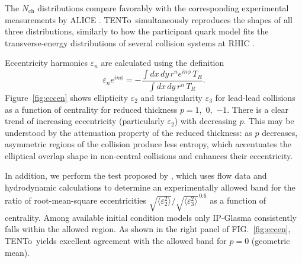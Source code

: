 \documentclass[aps,prc,reprint,amsmath,nofootinbib]{revtex4-1}
\newcommand{\trento}{T\raisebox{-.5ex}{R}ENTo}
\newcommand{\nch}{N_\text{ch}}
\newcommand{\eccratio}{\sqrt{\langle \varepsilon_2^2 \rangle}/\sqrt{\langle \varepsilon_3^2 \rangle}^{\,0.6}}
\begin{document}
The $\nch$ distributions compare favorably with the corresponding experimental measurements by ALICE \cite{Aamodt:2010ft,Abelev:2014mda}.
\trento\ simultaneously reproduces the shapes of all three distributions, similarly to how the participant quark model fits the transverse-energy distributions of several collision systems at RHIC \cite{Adler:2013aqf}.

Eccentricity harmonics $\varepsilon_n$ are calculated using the definition
\begin{equation}
  \varepsilon_n e^{i n\phi} = -\frac{\int dx \, dy\, r^n e^{i n \phi} \, T_R}{\int dx \, dy \, r^n \, T_R}.
\end{equation}
Figure~\ref{fig:eccen} shows ellipticity $\varepsilon_2$ and triangularity $\varepsilon_3$ for lead-lead collisions as a function of centrality for reduced thickness $p = 1$,~0,~$-1$.  There is a clear trend of increasing eccentricity
(particularly $\varepsilon_2$) with decreasing $p$.  This may be understood by the attenuation property of the
reduced thickness:  as $p$ decreases, asymmetric regions of the collision produce less entropy, which
accentuates the elliptical overlap shape in non-central collisions and enhances their eccentricity.

In addition, we perform the test proposed by \cite{Retinskaya:2013gca}, which uses flow data and hydrodynamic calculations to determine an experimentally allowed band for the ratio of root-mean-square eccentricities $\eccratio$ as a function of centrality.
Among available initial condition models only IP-Glasma consistently falls within the allowed region.
As shown in the right panel of FIG.~\ref{fig:eccen}, \trento\ yields excellent agreement with the allowed band for $p = 0$ (geometric mean).
\end{document}
